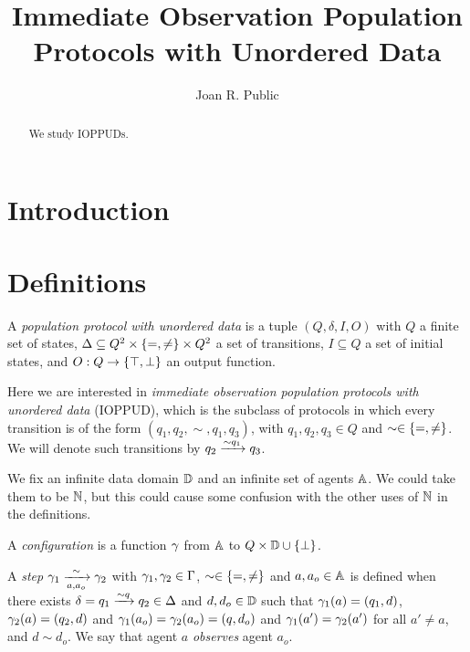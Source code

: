 \documentclass[a4paper,UKenglish,cleveref, autoref, thm-restate]{lipics-v2021}
\title{Immediate Observation Population Protocols with Unordered Data}
\author{Joan R. Public}{Department of Informatics, Dummy College, Country}{joanrpublic@dummycollege.org}{}{}
\begin{document}
	
	\maketitle
	
	
	\begin{abstract}
		We study IOPPUDs.
	\end{abstract}
	
	\section{Introduction}
	
	\section{Definitions}
	
	\begin{definition}
		A \emph{population protocol with unordered data} is a tuple $(Q, \delta, I, O)$ with $Q$ a finite set of states,
		$\Delta \subseteq Q^2 \times \{=, \neq\} \times Q^2$ a set of transitions,
		$I \subseteq Q$ a set of initial states, and
		$O : Q \to \{\top, \bot\}$ an output function.
		
		Here we are interested in \emph{immediate observation population protocols with unordered data} (IOPPUD), which is the subclass of protocols in which every transition is of the form $(q_1, q_2, \sim, q_1, q_3)$, with $q_1, q_2, q_3 \in Q$ and $\sim \in \{=, \neq\}$.
		We will denote such transitions by $q_2 \xrightarrow{\sim q_1} q_3$.
	\end{definition}
	
	We fix an infinite data domain $\mathbb{D}$ and an infinite set of agents $\mathbb{A}$. We could take them to be $\mathbb{N}$, but this could cause some confusion with the other uses of $\mathbb{N}$ in the definitions.
	
	A \emph{configuration} is a function $\gamma$ from $\mathbb{A}$ to $Q \times \mathbb{D} \cup \{\bot\}$.
	
	A \emph{step} $\gamma_1 \xrightarrow[a, a_o]{\sim} \gamma_2$ with $\gamma_1, \gamma_2 \in \Gamma$, $\sim \in \{=, \neq\}$ and $a, a_o \in \mathbb{A}$ is defined when there exists  $\delta = q_1 \xrightarrow{\sim q} q_2 \in \Delta$ and $d, d_o \in \mathbb{D}$ such that $\gamma_1(a) = (q_1, d)$, $\gamma_2(a) = (q_2, d)$ and $\gamma_1(a_o) = \gamma_2(a_o) = (q, d_o)$ and $\gamma_1(a') = \gamma_2(a')$ for all $a' \neq a$, and $d \sim d_o$.
	We say that agent $a$ \emph{observes} agent $a_o$. 
	
\end{document}
